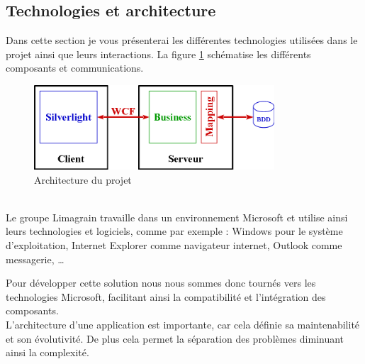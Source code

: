 
\subsection{Technologies et architecture}

Dans cette section je vous présenterai les différentes technologies utilisées dans le projet ainsi que leurs interactions.
La figure \ref{architecture} schématise les différents composants et communications.
\begin{figure}[!h]
	\center
	\includegraphics[width=0.8\textwidth]{img/architecture.png}
	\caption{Architecture du projet}
	\label{architecture}
\end{figure}
~~\\

Le groupe Limagrain travaille dans un environnement Microsoft et utilise ainsi leurs technologies et logiciels, comme par exemple : Windows pour le système d'exploitation, Internet Explorer comme navigateur internet, Outlook comme messagerie, \ldots

Pour développer cette solution nous nous sommes donc tournés vers les technologies Microsoft, facilitant ainsi la compatibilité et l'intégration des composants.
\\

L'architecture d'une application est importante, car cela définie sa maintenabilité et son évolutivité.
De plus cela permet la séparation des problèmes diminuant ainsi la complexité.

